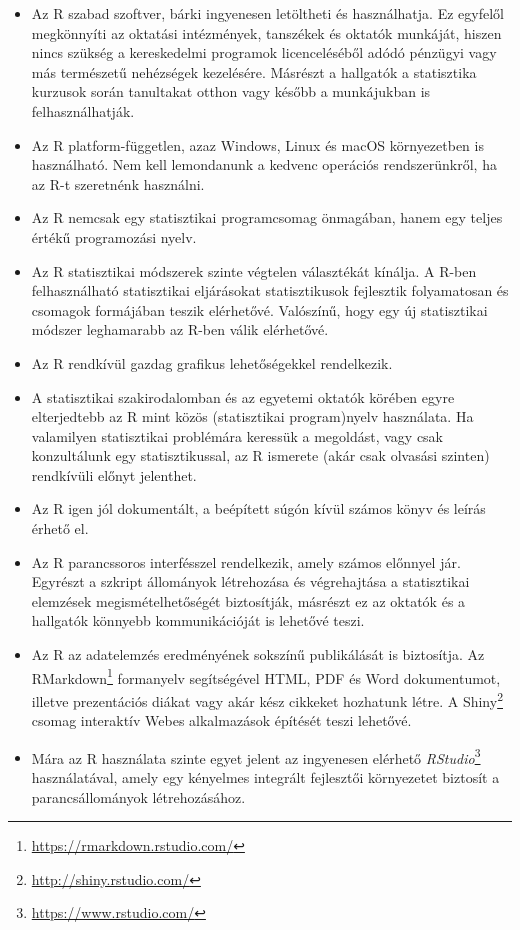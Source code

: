 \documentclass[
]{book}
\DeclareRobustCommand{\href}[2]{#2\footnote{\url{#1}}}
\providecommand{\tightlist}{%
  \setlength{\itemsep}{0pt}\setlength{\parskip}{0pt}}
\renewcommand{\href}[2]{#2\footnote{\url{#1}}}
\begin{document}
\begin{itemize}
\tightlist
\item
  Az R szabad szoftver, bárki ingyenesen letöltheti és használhatja. Ez egyfelől megkönnyíti az oktatási intézmények, tanszékek és oktatók munkáját, hiszen nincs szükség a kereskedelmi programok licenceléséből adódó pénzügyi vagy más természetű nehézségek kezelésére. Másrészt a hallgatók a statisztika kurzusok során tanultakat otthon vagy később a munkájukban is felhasználhatják.
\item
  Az R platform-független, azaz Windows, Linux és macOS környezetben is használható. Nem kell lemondanunk a kedvenc operációs rendszerünkről, ha az R-t szeretnénk használni.
\item
  Az R nemcsak egy statisztikai programcsomag önmagában, hanem egy teljes értékű programozási nyelv.
\item
  Az R statisztikai módszerek szinte végtelen választékát kínálja. A R-ben felhasználható statisztikai eljárásokat statisztikusok fejlesztik folyamatosan és csomagok formájában teszik elérhetővé. Valószínű, hogy egy új statisztikai módszer leghamarabb az R-ben válik elérhetővé.
\item
  Az R rendkívül gazdag grafikus lehetőségekkel rendelkezik.
\item
  A statisztikai szakirodalomban és az egyetemi oktatók körében egyre elterjedtebb az R mint közös (statisztikai program)nyelv használata. Ha valamilyen statisztikai problémára keressük a megoldást, vagy csak konzultálunk egy statisztikussal, az R ismerete (akár csak olvasási szinten) rendkívüli előnyt jelenthet.
\item
  Az R igen jól dokumentált, a beépített súgón kívül számos könyv és leírás érhető el.
\item
  Az R parancssoros interfésszel rendelkezik, amely számos előnnyel jár. Egyrészt a szkript állományok létrehozása és végrehajtása a statisztikai elemzések megismételhetőségét biztosítják, másrészt ez az oktatók és a hallgatók könnyebb kommunikációját is lehetővé teszi.
\item
  Az R az adatelemzés eredményének sokszínű publikálását is biztosítja. Az \href{https://rmarkdown.rstudio.com/}{RMarkdown} formanyelv segítségével HTML, PDF és Word dokumentumot, illetve prezentációs diákat vagy akár kész cikkeket hozhatunk létre. A \href{http://shiny.rstudio.com/}{Shiny} csomag interaktív Webes alkalmazások építését teszi lehetővé.
\item
  Mára az R használata szinte egyet jelent az ingyenesen elérhető \href{https://www.rstudio.com/}{\emph{RStudio}} használatával, amely egy kényelmes integrált fejlesztői környezetet biztosít a parancsállományok létrehozásához.
\end{itemize}
\end{document}

